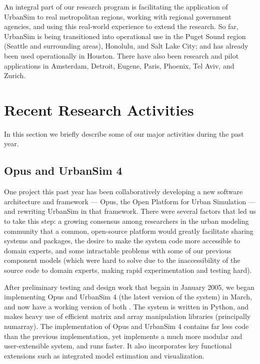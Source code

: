 \documentclass{acm_proc_article-sp}
\begin{document}
An integral part of our research program is facilitating the
application of UrbanSim to real metropolitan regions, working with
regional government agencies, and using this real-world experience
to extend the research.  So far, UrbanSim is being transitioned
into operational use in the Puget Sound region (Seattle and
surrounding areas), Honolulu, and Salt Lake City; and has already
been used operationally in Houston.  There have also been research
and pilot applications in Amsterdam, Detroit, Eugene, Paris,
Phoenix, Tel Aviv, and Zurich.

\section{Recent Research Activities}

In this section we briefly describe some of our major activities during the
past year.

\subsection{Opus and UrbanSim 4}
\label{opus}

One project this past year has been collaboratively
developing a new software architecture and framework --- Opus, the Open
Platform for Urban Simulation --- and rewriting UrbanSim in that framework.
There were several factors that led us to take this step: a growing
consensus among researchers in the urban modeling community that a common,
open-source platform would greatly facilitate sharing systems and packages,
the desire to make the system code more accessible to domain experts, and
some intractable problems with some of our previous component models (which
were hard to solve due to the inaccessibility of the source code to domain
experts, making rapid experimentation and testing hard).

After preliminary testing and design work that begain in January
2005, we began implementing Opus and UrbanSim 4 (the latest
version of the system) in March, and now have a working version of
both \cite{waddell-opus-2005}. The system is written in Python,
and makes heavy use of efficient matrix and array manipulation
libraries (principally numarray).  The implementation of Opus and
UrbanSim 4 contains far less code than the previous
implementation, yet implements a much more modular and
user-extensible system, and runs faster.  It also incorporates key
functional extensions such as integrated model estimation and
visualization.
\end{document}

